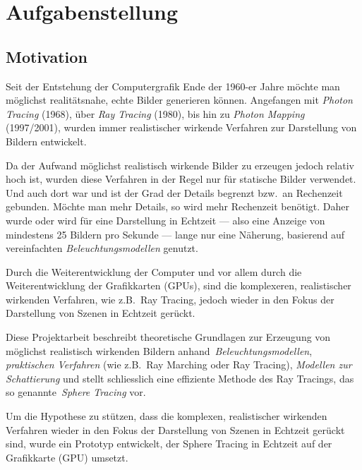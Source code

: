 
\chapter{Aufgabenstellung}
\label{chap:scope}

\section{Motivation}
\label{sec:motivation}

Seit der Entstehung der Computergrafik Ende der 1960-er Jahre möchte man
möglichst realitätsnahe, echte Bilder generieren können. Angefangen mit
\textit{Photon Tracing} (1968), über \textit{Ray Tracing} (1980), bis hin
zu \textit{Photon Mapping} (1997/2001), wurden immer realistischer
wirkende Verfahren zur Darstellung von Bildern entwickelt.

Da der Aufwand möglichst realistisch wirkende Bilder zu erzeugen jedoch
relativ hoch ist, wurden diese Verfahren in der Regel nur für statische
Bilder verwendet. Und auch dort war und ist der Grad der Details
begrenzt bzw.\ an Rechenzeit gebunden. Möchte man mehr Details, so wird
mehr Rechenzeit benötigt. Daher wurde oder wird für eine Darstellung in
Echtzeit --- also eine Anzeige von mindestens 25 Bildern pro
Sekunde --- lange nur eine Näherung, basierend auf vereinfachten
\textit{Beleuchtungsmodellen} genutzt.

Durch die Weiterentwicklung der Computer und vor allem durch die
Weiterentwicklung der Grafikkarten (GPUs), sind die komplexeren,
realistischer wirkenden Verfahren, wie z.B.\ Ray Tracing, jedoch
wieder in den Fokus der Darstellung von Szenen in Echtzeit gerückt.

Diese Projektarbeit beschreibt theoretische Grundlagen zur Erzeugung von
möglichst realistisch wirkenden Bildern
anhand~\textit{Beleuchtungsmodellen}, \textit{praktischen Verfahren}
(wie z.B.\ Ray Marching oder Ray Tracing), \textit{Modellen zur
    Schattierung} und stellt schliesslich eine effiziente Methode des
Ray Tracings, das so genannte~\textit{Sphere Tracing} vor.

Um die Hypothese zu stützen, dass die komplexen, realistischer wirkenden
Verfahren wieder in den Fokus der Darstellung von Szenen in Echtzeit
gerückt sind, wurde ein Prototyp entwickelt, der Sphere Tracing in
Echtzeit auf der Grafikkarte (GPU) umsetzt.

